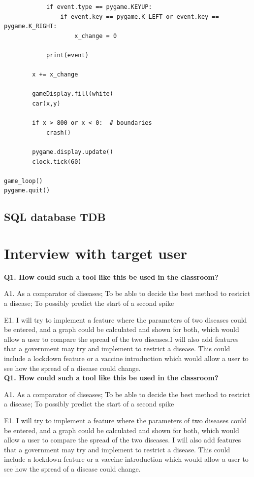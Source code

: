 \documentclass[11pt, a4paper]{article}
\begin{document}
\begin{lstlisting}
            if event.type == pygame.KEYUP:
                if event.key == pygame.K_LEFT or event.key == pygame.K_RIGHT:
                    x_change = 0

            print(event)

        x += x_change

        gameDisplay.fill(white)
        car(x,y)

        if x > 800 or x < 0:  # boundaries
            crash()

        pygame.display.update()
        clock.tick(60)

game_loop()
pygame.quit()
\end{lstlisting}


\subsection{SQL database TDB}

\newpage
\section{Interview with target user}
\textbf{Q1. How could such a tool like this be used in the classroom?}

A1. As a comparator of diseases; To be able to decide the best method to restrict a disease; To possibly predict the start of a second spike

E1. I will try to implement a feature where the parameters of two diseases could be entered, and a graph could be calculated and shown for both, which would allow a user to compare the spread of the two diseases.I will also add features that a government may try and implement to restrict a disease. This could include a lockdown feature or a vaccine introduction which would allow a user to see how the spread of a disease could change.
\\

\textbf{Q1. How could such a tool like this be used in the classroom?}

A1. As a comparator of diseases; To be able to decide the best method to restrict a disease; To possibly predict the start of a second spike

E1. I will try to implement a feature where the parameters of two diseases could be entered, and a graph could be calculated and shown for both, which would allow a user to compare the spread of the two diseases. I will also add features that a government may try and implement to restrict a disease. This could include a lockdown feature or a vaccine introduction which would allow a user to see how the spread of a disease could change.
\end{document}
